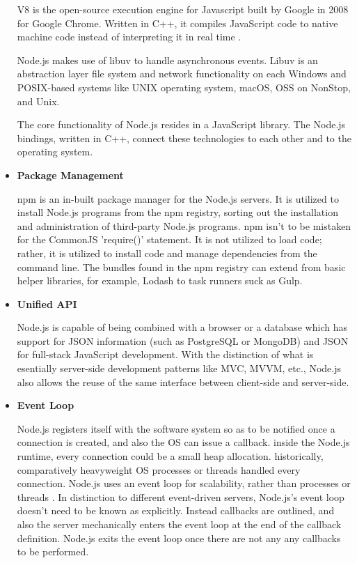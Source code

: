 \documentclass[../thesis.tex]{subfiles}
\begin{document}
\begin{itemize}
    V8 is the open-source execution engine for Javascript built by Google in 2008 for Google Chrome. Written in C++, it compiles JavaScript code to native machine code instead of interpreting it in real time \cite{14}.
    \newline
    
    Node.js makes use of libuv to handle asynchronous events. Libuv is an abstraction layer file system and network functionality on each Windows and POSIX-based systems like UNIX operating system, macOS, OSS on NonStop, and Unix.
    \newline
    
    The core functionality of Node.js resides in a JavaScript library. The Node.js bindings, written in C++, connect these technologies to each other and to the operating system.
    \newline
    
    \item \textbf{Package Management}
    \newline
    
    npm is an in-built package manager for the Node.js servers. It is utilized to install Node.js programs from the npm registry, sorting out the installation and administration of third-party Node.js programs. npm isn't to be mistaken for the CommonJS 'require()' statement. It is not utilized to load code; rather, it is utilized to install code and manage dependencies from the command line. The bundles found in the npm registry can extend from basic helper libraries, for example, Lodash to task runners suck as Gulp.
    \newline
    
    \item \textbf{Unified API}
    \newline
    
    Node.js is capable of being combined with a browser or a database which has support for JSON information (such as PostgreSQL or MongoDB) and JSON for full-stack JavaScript development. With the distinction of what is esentially server-side development patterns like MVC, MVVM, etc., Node.js also allows the reuse of the same interface between client-side and server-side.
    \newline
    
    \item \textbf{Event Loop}
    \newline
    
    Node.js registers itself with the software system so as to be notified once a connection is created, and also the OS can issue a callback. inside the Node.js runtime, every connection could be a small heap allocation. historically, comparatively heavyweight OS processes or threads handled every connection. Node.js uses an event loop for scalability, rather than processes or threads \cite{node}. In distinction to different event-driven servers, Node.js's event loop doesn't need to be known as explicitly. Instead callbacks are outlined, and also the server mechanically enters the event loop at the end of the callback definition. Node.js exits the event loop once there are not any any callbacks to be performed.
    \newline
    

\end{itemize}
\end{document}
